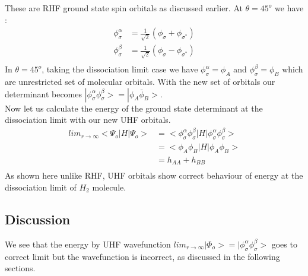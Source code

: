\documentclass[11pt]{article}   	%
\begin{document}
	These are RHF ground state spin orbitals as discussed earlier. At $\theta=45^o$ we have :\\
	\begin{equation}
	\begin{split}
		\phi_{\sigma}^{\alpha}&=\frac{1}{\sqrt{2}}(\phi_{\sigma}+\phi_{\sigma^*})\\
		\phi_{\sigma}^{\beta}&=\frac{1}{\sqrt{2}}(\phi_{\sigma}-\phi_{\sigma^*})\\
	\end{split}
	\end{equation}
	In $\theta=45^o$, taking the dissociation limit case we have 
	$\phi_{\sigma}^{\alpha}=\phi_A$ and $\phi_{\sigma}^{\beta}=\phi_B$ which are unrestricted set of 
	molecular orbitals.
	With the new set of orbitals our determinant becomes $|\phi_{\sigma}^{\alpha}\phi_{\sigma}^{\beta}>
	=|\phi_A\bar{\phi}_B>$.\\ 
	Now let us calculate the energy of the ground state determinant at the dissociation limit with our new UHF orbitals. \\
	\begin{equation}
		\begin{split}
			lim_{r\rightarrow \infty}<\Psi_o|H|\Psi_o>&=<\phi_{\sigma}^{\alpha}
			\phi_{\sigma}^{\beta}|H|\phi_{\sigma}^{\alpha}\phi_{\sigma}^{\beta}>\\
				&=<\phi_A\phi_B|H|\phi_A\phi_B>\\
				&=h_{AA}+h_{BB}\\
		\end{split}
	\end{equation}
	As shown here unlike RHF, UHF orbitals show correct behaviour of energy at the dissociation 
	limit of $H_2$ molecule.\\
	\subsection{Discussion}
	We see that the energy by UHF wavefunction $lim_{r\rightarrow\infty}|\Phi_o>=|\phi_{\sigma}^{\alpha}\phi_{\sigma}^{\beta}>$ goes to
	correct limit but the wavefunction is incorrect, as discussed in the following sections. \\
\end{document}
